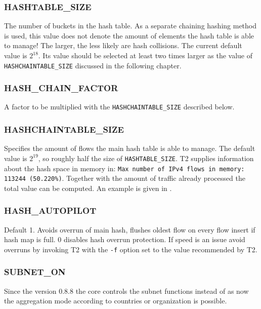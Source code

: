 \subsubsection{HASHTABLE\_SIZE}
The number of buckets in the hash table.
As a separate chaining hashing method is used, this value does not denote the amount of elements the hash table is able to manage!
The larger, the less likely are hash collisions.
The current default value is $2^{18}$.
Its value should be selected at least two times larger as the value of {\tt HASHCHAINTABLE\_SIZE} discussed in the following chapter.

\subsubsection{HASH\_CHAIN\_FACTOR}
A factor to be multiplied with the {\tt HASHCHAINTABLE\_SIZE} described below.

\subsubsection{HASHCHAINTABLE\_SIZE}
Specifies the amount of flows the main hash table is able to manage.
The default value is $2^{19}$, so roughly half the size of {\tt HASHTABLE\_SIZE}.
T2 supplies information about the hash space in memory in: {\tt Max number of IPv4 flows in memory: 113244 (50.220\%)}.
Together with the amount of traffic already processed the total value can be computed.
An example is given in .

\subsubsection{HASH\_AUTOPILOT}\label{hash_autopilot}
Default 1. Avoids overrun of main hash, flushes oldest flow on every flow insert if hash map is full. 0 disables
hash overrun protection. If speed is an issue avoid overruns by invoking T2 with the {\tt -f} option set to the value
recommended by T2.

\subsubsection{SUBNET\_ON}
Since the version 0.8.8 the core controls the subnet functions instead of  as
now the aggregation mode according to countries or organization is possible.

